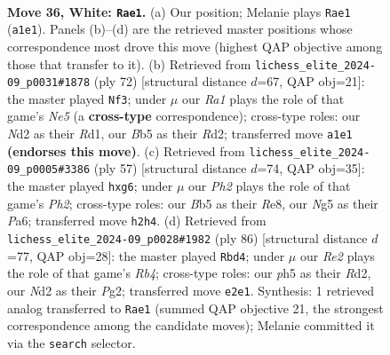 \documentclass[11pt]{article}
\begin{document}
\clearpage

\begin{figure}[p]\centering
\begin{subfigure}{0.46\textwidth}\centering
\resizebox{\linewidth}{!}{%
\newchessgame
\chessboard[
  setfen={2b2k2/r4p2/3q1np1/1B4Np/P7/6P1/1p1NRP1P/R5K1 w - - 0 36},
  showmover=false,
  pgfstyle=straightmove, color=movearrow, markmove={a1-e1}
]}
\caption{}
\end{subfigure}\hfill
\begin{subfigure}{0.46\textwidth}\centering
\resizebox{\linewidth}{!}{%
\newchessgame
\chessboard[
  setfen={3r1bk1/3P1p1p/4q1p1/4N3/5B2/4P2P/3R1PP1/3R2K1 w - - 5 37},
  showmover=false,
  pgfstyle=straightmove, color=movearrow, markmove={e5-f3}
]}
\caption{}
\end{subfigure}
\\[4pt]
\begin{subfigure}{0.46\textwidth}\centering
\resizebox{\linewidth}{!}{%
\newchessgame
\chessboard[
  setfen={4r2k/1p3r1p/p1p2pB1/6b1/P5Q1/2P5/1P4PP/5R1K b - - 0 29},
  showmover=false,
  pgfstyle=straightmove, color=movearrow, markmove={h7-g6}
]}
\caption{}
\end{subfigure}\hfill
\begin{subfigure}{0.46\textwidth}\centering
\resizebox{\linewidth}{!}{%
\newchessgame
\chessboard[
  setfen={2r5/p3r1k1/bp4p1/2nB3p/1R2P2P/P3K1N1/3R2P1/8 w - - 25 44},
  showmover=false,
  pgfstyle=straightmove, color=movearrow, markmove={b4-d4}
]}
\caption{}
\end{subfigure}
\caption{\textbf{Move 36, White: \texttt{Rae1}.} (a) Our position; Melanie plays \texttt{Rae1} (\texttt{a1e1}). Panels (b)--(d) are the retrieved master positions whose correspondence most drove this move (highest QAP objective among those that transfer to it). (b) Retrieved from \texttt{lichess\_elite\_2024-09\_p0031\#1878} (ply 72) [structural distance $d$=67, QAP obj=21]: the master played \texttt{Nf3}; under $\mu$ our \emph{Ra1} plays the role of that game's \emph{Ne5} (a \textbf{cross-type} correspondence); cross-type roles: our \emph{N}d2 as their \emph{R}d1, our \emph{B}b5 as their \emph{R}d2; transferred move \texttt{a1e1} \textbf{(endorses this move)}. (c) Retrieved from \texttt{lichess\_elite\_2024-09\_p0005\#3386} (ply 57) [structural distance $d$=74, QAP obj=35]: the master played \texttt{hxg6}; under $\mu$ our \emph{Ph2} plays the role of that game's \emph{Ph2}; cross-type roles: our \emph{B}b5 as their \emph{R}e8, our \emph{N}g5 as their \emph{P}a6; transferred move \texttt{h2h4}. (d) Retrieved from \texttt{lichess\_elite\_2024-09\_p0028\#1982} (ply 86) [structural distance $d$=77, QAP obj=28]: the master played \texttt{Rbd4}; under $\mu$ our \emph{Re2} plays the role of that game's \emph{Rb4}; cross-type roles: our \emph{p}h5 as their \emph{R}d2, our \emph{N}d2 as their \emph{P}g2; transferred move \texttt{e2e1}. Synthesis: 1 retrieved analog transferred to \texttt{Rae1} (summed QAP objective 21, the strongest correspondence among the candidate moves); Melanie committed it via the \texttt{search} selector.}
\label{fig:thought-m70}
\end{figure}
\end{document}
